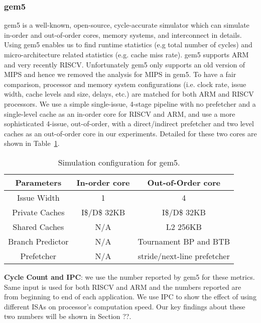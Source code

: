 \subsubsection{gem5}
gem5 is a well-known, open-source, cycle-accurate simulator which can simulate in-order and out-of-order cores, memory systems, and interconnect in details. Using gem5 enables us to find runtime statistics (e.g total number of cycles) and micro-architecture related statistics (e.g. cache miss rate). gem5 supports ARM and very recently RISCV. Unfortunately gem5 only supports an old version of MIPS and hence we removed the analysis for MIPS in gem5. To have a fair comparison, processor and memory system configurations (i.e. clock rate, issue width, cache levels and size, delays, etc.) are matched for both ARM and RISCV processors. We use a simple single-issue, 4-stage pipeline with no prefetcher and a single-level cache as an in-order core for RISCV and ARM, and use a more sophisticated 4-issue, out-of-order, with a direct/indirect prefetcher and two level caches as an out-of-order core in our experiments. Detailed for these two cores are shown in Table~\ref{t:config}.

\begin{table}[h]
\caption{Simulation configuration for gem5.}
\begin{tabular}{|c|c|c|}
\hline
\small \textbf{Parameters} &\small \textbf{In-order core} &\small \textbf{Out-of-Order core} \\
\hline \hline
\small Issue Width & \small 1 & \small 4 \\
\hline
\small Private Caches & \small I\$/D\$ 32KB & \small I\$/D\$ 32KB\\
\hline
\small Shared Caches & \small N/A & \small L2 256KB \\
\hline
\small Branch Predictor & \small N/A & \small Tournament BP and BTB \\
\hline
\small Prefetcher & \small N/A & \small stride/next-line prefetcher \\
\hline
\end{tabular}
\label{t:config}
\end{table}

\noindent \textbf{Cycle Count and IPC}: we use the number reported by gem5 for these metrics. Same input is used for both RISCV and ARM and the numbers reported are from beginning to end of each application. We use IPC to show the effect of using different ISAs on processor's computation speed. Our key findings about these two numbers will be shown in Section ??. 

